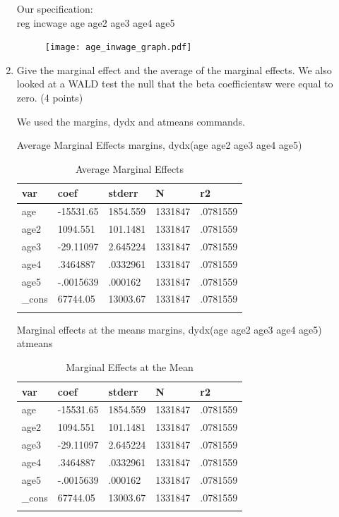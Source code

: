 \documentclass{article}
\begin{document}
\begin{enumerate}[label=\alph*]
Our specification:\\
reg incwage age age2 age3 age4 age5

\begin{figure}
\caption{\label {age incwage}}
\texttt{[image: age\_inwage\_graph.pdf]}
\end{figure}

\item  Give the marginal effect and the average of the marginal effects. 
We also looked at a WALD test the null that the beta coefficientsw were equal to zero. (4 points)

We used the margins, dydx and atmeans commands.

Average Marginal Effects 
margins, dydx(age age2 age3 age4 age5)

\begin{table}[tbp] \centering
{}

\caption{Average Marginal Effects}
\begin{tabularx}{\textwidth}{lCCCC}

\toprule
{var}&{coef}&{stderr}&{N}&{r2} \tabularnewline
\midrule\addlinespace[1.5ex]
age&-15531.65&1854.559&1331847&.0781559 \tabularnewline
age2&1094.551&101.1481&1331847&.0781559 \tabularnewline
age3&-29.11097&2.645224&1331847&.0781559 \tabularnewline
age4&.3464887&.0332961&1331847&.0781559 \tabularnewline
age5&-.0015639&.000162&1331847&.0781559 \tabularnewline
\_cons&67744.05&13003.67&1331847&.0781559 \tabularnewline
\bottomrule \addlinespace[1.5ex]

\end{tabularx}
\end{table}




Marginal effects at the means
margins, dydx(age age2 age3 age4 age5) atmeans

\begin{table}[tbp] \centering
	
	\caption{Marginal Effects at the Mean}
	\begin{tabularx}{\textwidth}{lCCCC}
		
		\toprule
		{var}&{coef}&{stderr}&{N}&{r2} \tabularnewline
		\midrule\addlinespace[1.5ex]
		age&-15531.65&1854.559&1331847&.0781559 \tabularnewline
		age2&1094.551&101.1481&1331847&.0781559 \tabularnewline
		age3&-29.11097&2.645224&1331847&.0781559 \tabularnewline
		age4&.3464887&.0332961&1331847&.0781559 \tabularnewline
		age5&-.0015639&.000162&1331847&.0781559 \tabularnewline
		\_cons&67744.05&13003.67&1331847&.0781559 \tabularnewline
		\bottomrule \addlinespace[1.5ex]
		

\end{tabularx}
\end{table}
\end{enumerate}
\end{document}
